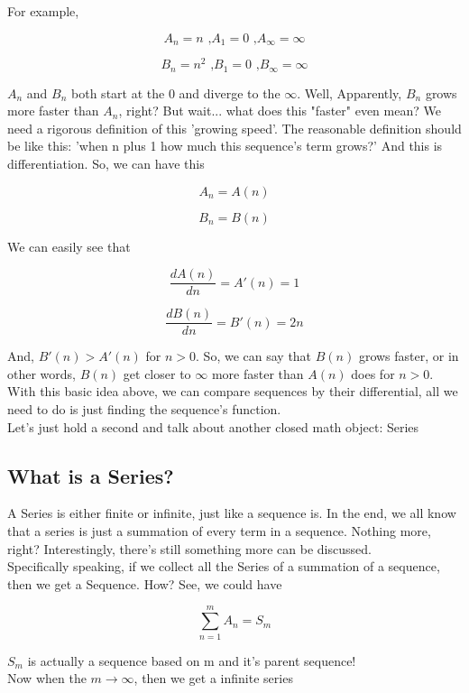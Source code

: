 \documentclass{article}
\begin{document}
  For example, 

  \[
	  A_n = n \text{ ,} A_1 = 0 \text{ ,} A_\infty = \infty
  \]

  \[
	  B_n = n^2 \text{ ,} B_1 = 0 \text{ ,} B_\infty = \infty
  \]

  $A_n$ and $B_n$ both start at the $0$ and diverge to the $\infty$. Well, Apparently, $B_n$ grows more faster than $A_n$, right? But wait... what does this "faster" even mean? We need a rigorous definition of this 'growing speed'. The reasonable definition should be like this: 'when n plus 1 how much this sequence's term grows?' And this is differentiation. So, we can have this 

  \[
	  A_n = A(n)
  \]

  \[
	  B_n = B(n)
  \]

  We can easily see that 
  
  \[
	  \dfrac{dA(n)}{dn} = A'(n) = 1
  \]

  \[
	  \dfrac{dB(n)}{dn} = B'(n) = 2n
  \]

  And, $B'(n)>A'(n)$ for $n>0$. So, we can say that $B(n)$ grows faster, or in other words, $B(n)$ get closer to $\infty$ more faster than $A(n)$ does for $n>0$. \\

  With this basic idea above, we can compare sequences by their differential, all we need to do is just finding the sequence's function. \\

  Let's just hold a second and talk about another closed math object: Series

  \subsection{What is a Series?}
  A Series is either finite or infinite, just like a sequence is. In the end, we all know that a series is just a summation of every term in a sequence. Nothing more, right? Interestingly, there's still something more can be discussed. \\

  Specifically speaking, if we collect all the Series of a summation of a sequence, then we get a Sequence. How? See, we could have

  \[
	  \sum_{n=1}^{m} A_n = S_m
  \]

  $S_m$ is actually a sequence based on m and it's parent sequence! \\

  Now when the $m \to \infty$, then we get a infinite series
\end{document}
